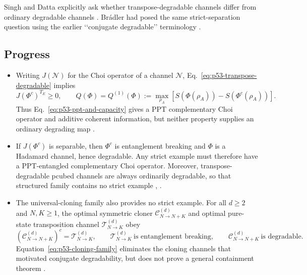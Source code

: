 Singh and Datta explicitly ask whether transpose-degradable channels differ
from ordinary degradable channels
.  Br{\'a}dler had posed the same
strict-separation question using the earlier \lq\lq conjugate degradable\rq\rq{}
terminology .

\subsection*{Progress}

\begin{itemize}
  \item Writing $J(\mathcal N)$ for the Choi operator of a channel
  $\mathcal N$, Eq.~\eqref{eq:p53-transpose-degradable} implies
  \begin{equation}
    J(\Phi^c)^{T_E}\geq0,
    \qquad
    Q(\Phi)=Q^{(1)}(\Phi)
    :=\max_{\rho_A}
       \left[S(\Phi(\rho_A))-S(\Phi^c(\rho_A))\right].
    \label{eq:p53-ppt-and-capacity}
  \end{equation}
  Thus Eq.~\eqref{eq:p53-ppt-and-capacity} gives a PPT complementary Choi
  operator and additive coherent information, but neither property supplies an
  ordinary degrading map .

  \item If $J(\Phi^c)$ is separable, then $\Phi^c$ is entanglement breaking and
  $\Phi$ is a Hadamard channel, hence degradable.  Any strict example must
  therefore have a PPT-entangled complementary Choi operator.  Moreover,
  transpose-degradable pcubed channels are always ordinarily degradable, so
  that structured family contains no strict example
  ,
  .

  \item The universal-cloning family also provides no strict example.  For all
  $d\geq2$ and $N,K\geq1$, the optimal symmetric cloner
  $\mathcal C_{N\to N+K}^{(d)}$ and optimal pure-state transposition channel
  $\mathcal T_{N\to K}^{(d)}$ obey
  \begin{equation}
    \left(\mathcal C_{N\to N+K}^{(d)}\right)^c
      =\mathcal T_{N\to K}^{(d)},
    \qquad
    \mathcal T_{N\to K}^{(d)}\ \text{is entanglement breaking},
    \qquad
    \mathcal C_{N\to N+K}^{(d)}\ \text{is degradable}.
    \label{eq:p53-cloning-family}
  \end{equation}
  Equation~\eqref{eq:p53-cloning-family} eliminates the cloning channels that
  motivated conjugate degradability, but does not prove a general containment
  theorem .


\end{itemize}
